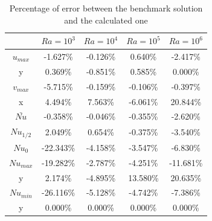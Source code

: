 \begin{table}[h]
	\centering
	\begin{tabular}{c|c|c|c|c|}
		\cline{2-5}
		\multicolumn{1}{l|}{}       & $Ra=10^{3}$ & $Ra=10^{4}$ & $Ra=10^{5}$ & $Ra=10^{6}$ \\ \hline
		\multicolumn{1}{|c|}{$u_{max}$}  & -1.627\%                    & -0.126\%                    & 0.640\%                     & -2.417\%                    \\ \hline
		\multicolumn{1}{|c|}{y}     & 0.369\%                     & -0.851\%                    & 0.585\%                     & 0.000\%                     \\ \hline
		\multicolumn{1}{|c|}{$v_{max}$}  & -5.715\%                    & -0.159\%                    & -0.106\%                    & -0.397\%                    \\ \hline
		\multicolumn{1}{|c|}{x}     & 4.494\%                     & 7.563\%                     & -6.061\%                    & 20.844\%                    \\ \hline
		\multicolumn{1}{|c|}{$\bar{Nu}$} & -0.358\%                    & -0.046\%                    & -0.355\%                    & -2.620\%                    \\ \hline
		\multicolumn{1}{|c|}{$Nu_{1/2}$}  & 2.049\%                     & 0.654\%                     & -0.375\%                    & -3.540\%                    \\ \hline
		\multicolumn{1}{|c|}{$Nu_{0}$}   & -22.343\%                   & -4.158\%                    & -3.547\%                    & -6.830\%                    \\ \hline
		\multicolumn{1}{|c|}{$Nu_{max}$} & -19.282\%                   & -2.787\%                    & -4.251\%                    & -11.681\%                   \\ \hline
		\multicolumn{1}{|c|}{y}     & 2.174\%                     & -4.895\%                    & 13.580\%                    & 20.635\%                    \\ \hline
		\multicolumn{1}{|c|}{$Nu_{min}$} & -26.116\%                   & -5.128\%                    & -4.742\%                    & -7.386\%                    \\ \hline
		\multicolumn{1}{|c|}{y}     & 0.000\%                     & 0.000\%                     & 0.000\%                     & 0.000\%                     \\ \hline
	\end{tabular}
	\caption{Percentage of error between the benchmark solution and the calculated one}
\end{table}